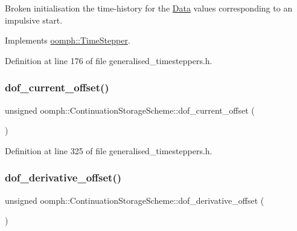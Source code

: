 Broken initialisation the time-\/history for the \hyperlink{classoomph_1_1Data}{Data} values corresponding to an impulsive start. 



Implements \hyperlink{classoomph_1_1TimeStepper_a7e894df13c88c96dd8eced2700228225}{oomph\+::\+Time\+Stepper}.



Definition at line 176 of file generalised\+\_\+timesteppers.\+h.

\mbox{\label{classoomph_1_1ContinuationStorageScheme_a8f074b7e24750498f7d640e6476bef61}} 
\subsubsection{\texorpdfstring{dof\+\_\+current\+\_\+offset()}{dof\_current\_offset()}}
{\footnotesize\ttfamily unsigned oomph\+::\+Continuation\+Storage\+Scheme\+::dof\+\_\+current\+\_\+offset (\begin{DoxyParamCaption}{ }\end{DoxyParamCaption})\hspace{0.3cm}{\ttfamily [inline]}}



Definition at line 325 of file generalised\+\_\+timesteppers.\+h.

\mbox{\label{classoomph_1_1ContinuationStorageScheme_acef989300e17ce031538fe447f13c4d8}} 
\subsubsection{\texorpdfstring{dof\+\_\+derivative\+\_\+offset()}{dof\_derivative\_offset()}}
{\footnotesize\ttfamily unsigned oomph\+::\+Continuation\+Storage\+Scheme\+::dof\+\_\+derivative\+\_\+offset (\begin{DoxyParamCaption}{ }\end{DoxyParamCaption})\hspace{0.3cm}{\ttfamily [inline]}}



